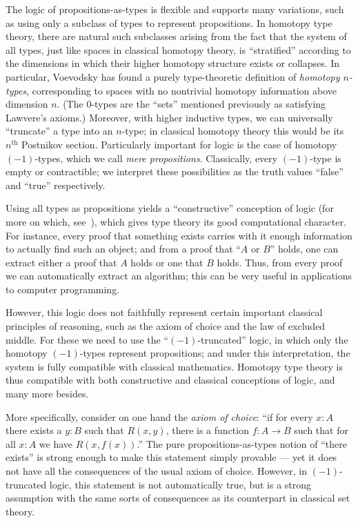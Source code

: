 The logic of propositions-as-types is flexible and supports many variations, such as using only a subclass of types to represent propositions.
In homotopy type theory, there are natural such subclasses arising from the fact that the system of all types, just like spaces in classical homotopy theory, is ``stratified'' according to the dimensions in which their higher homotopy structure exists or collapses.
In particular, Voevodsky has found a purely type-theoretic definition of \emph{homotopy $n$-types}, corresponding to spaces with no nontrivial homotopy information above dimension $n$.
(The $0$-types are the ``sets'' mentioned previously as satisfying Lawvere's axioms.)
Moreover, with higher inductive types, we can universally ``truncate'' a type into an $n$-type; in classical homotopy theory this would be its $n^{\mathrm{th}}$ Postnikov section.
Particularly important for logic is the case of homotopy $(-1)$-types, which we call \emph{mere propositions}.
Classically, every $(-1)$-type is empty or contractible; we interpret these possibilities as the truth values ``false'' and ``true'' respectively.

Using all types as propositions yields a ``constructive'' conception of logic (for more on which, see~\citep{kolmogorov,TroelstraI,TroelstraII}), which gives type theory its good 
computational character.
For instance, every proof that something exists carries with it enough information to actually find such an object; and from a proof that  ``$A$ or $B$'' holds, one can extract either a proof that $A$ holds or one that $B$ holds.
Thus, from every proof we can automatically extract an algorithm;  this can be very useful in applications to computer programming.

However, this logic does not faithfully represent certain important classical principles of reasoning, such as the axiom of choice and the law of excluded middle.
For these we need to use the ``$(-1)$-truncated'' logic, in which only the homotopy $(-1)$-types represent propositions; and under this interpretation, the system is fully compatible with classical mathematics.
Homotopy type theory is thus compatible with both constructive and classical conceptions of logic, and many more besides.

%
More specifically, consider on one hand the \emph{axiom of choice}: ``if for every $x: A$ there exists a $y:B$ such that $R(x,y)$, there is a function $f : A\to B$ such that for all $x:A$ we have $R(x, f(x))$.''
The pure propositions-as-types notion of ``there exists'' is strong enough to make this statement simply provable --- yet it does not have all the consequences of the usual axiom of choice.
However, in $(-1)$-truncated logic, this statement is not automatically true, but is a strong assumption with the same sorts of consequences as its counterpart in classical set theory.

